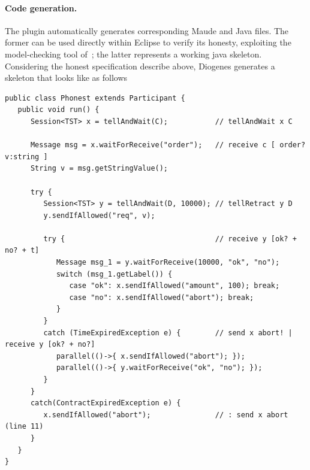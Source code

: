 \paragraph{Code generation.}
The plugin automatically generates corresponding Maude and Java files.
The former can be used directly within Eclipse to verify its honesty,
exploiting the model-checking tool of~\cite{verifiable};
the latter represents a working java skeleton. 
Considering the honest specification describe above,
Diogenes generates a skeleton that looks like as follows
\begin{mdframed}
\begin{verbatim}
public class Phonest extends Participant { 
   public void run() {
      Session<TST> x = tellAndWait(C);           // tellAndWait x C
       
      Message msg = x.waitForReceive("order");   // receive c [ order? v:string ]
      String v = msg.getStringValue();
      
      try {
         Session<TST> y = tellAndWait(D, 10000); // tellRetract y D
         y.sendIfAllowed("req", v);
         
         try {                                   // receive y [ok? + no? + t]
            Message msg_1 = y.waitForReceive(10000, "ok", "no");
            switch (msg_1.getLabel()) {                    
               case "ok": x.sendIfAllowed("amount", 100); break;
               case "no": x.sendIfAllowed("abort"); break;                    
            }
         }
         catch (TimeExpiredException e) {        // send x abort! | receive y [ok? + no?] 
            parallel(()->{ x.sendIfAllowed("abort"); });
            parallel(()->{ y.waitForReceive("ok", "no"); });
         }            
      }
      catch(ContractExpiredException e) {
         x.sendIfAllowed("abort");               // : send x abort (line 11)
      }
   }
}
\end{verbatim}
\end{mdframed}


